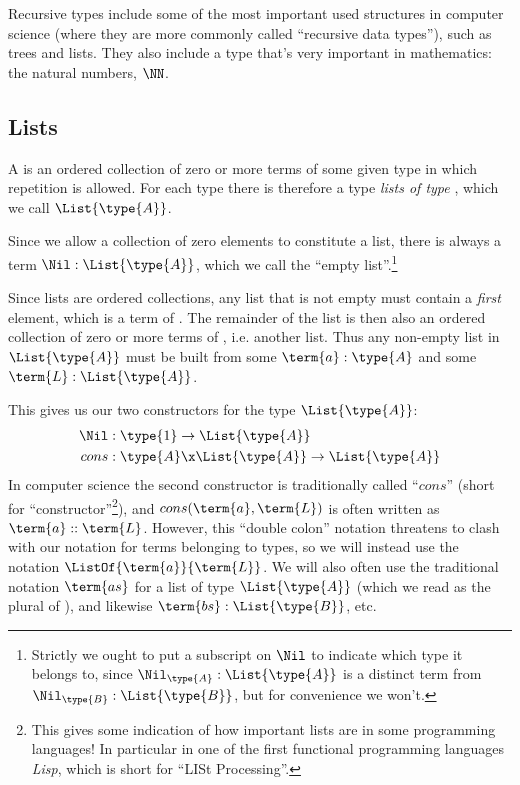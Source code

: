 Recursive types include some of the most important used structures in computer science 
(where they are more commonly called ``recursive data types''), such as trees and lists.  They also include a type that's very important in mathematics: the natural numbers, $\NN$.



\subsection{Lists}

A  is an ordered collection of zero or more terms of some given type  in which repetition is allowed.  For each type  there is therefore a type \emph{lists of type }, which we call $\List{\type{A}}$.

Since we allow a collection of zero elements to constitute a list, there is always a term $\Nil: \List{\type{A}}$, which we call the ``empty list''.\footnote{
Strictly we ought to put a subscript on $\Nil$ to indicate which type it belongs to, since 
$\Nil_{\type{A}}:\List{\type{A}}$
is a distinct term from 
$\Nil_{\type{B}}:\List{\type{B}}$, but for convenience we won't.
}

Since lists are ordered collections, any list that is not empty must contain a \emph{first} element, which is a term of .  The remainder of the list is then also an ordered collection of zero or more terms of , i.e. another list.  Thus any non-empty list in $\List{\type{A}}$ must be built from some $\term{a}:\type{A}$ and some $\term{L}:\List{\type{A}}$.

This gives us our two constructors for the type $\List{\type{A}}$:
\begin{align*}
\Nil&: \type{1} \to \List{\type{A}}  \\
cons&: \type{A} \x \List{\type{A}} \to \List{\type{A}}
\end{align*}
In computer science the second constructor is traditionally called ``$cons$'' (short for ``constructor''\footnote{
This gives some indication of how important lists are in some programming languages!  In particular in one of the first functional programming languages \emph{Lisp}, which is short for ``LISt Processing''.
}), and $cons(\term{a}, \term{L})$ is often written as $\term{a}::\term{L}$.  However, this ``double colon'' notation threatens to clash with our notation for terms belonging to types, so we will instead use the notation $\ListOf{\term{a}}{\term{L}}$.  We will also often use the traditional notation $\term{as}$ for a list of type $\List{\type{A}}$ (which we read as the plural of ), and likewise $\term{bs}:\List{\type{B}}$, etc.






